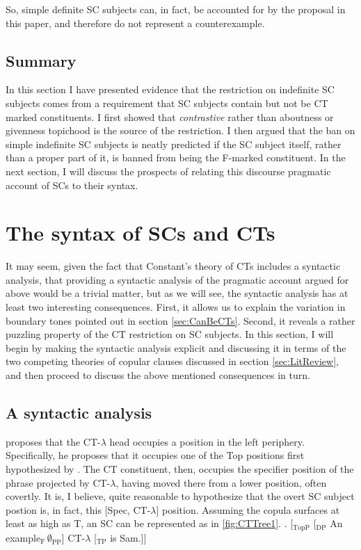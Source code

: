 \documentclass[
	letterpaper,
]{article}
\begin{document}
So, simple definite SC subjects can, in fact, be accounted for by the proposal in this paper, and therefore do not represent a counterexample.
\subsection{Summary}
In this section I have presented evidence that the restriction on indefinite SC subjects comes from a requirement that SC subjects contain but not be CT marked constituents.
I first showed that \textit{contrastive} rather than aboutness or givenness topichood is the source of the restriction.
I then argued that the ban on simple indefinite SC subjects is neatly predicted if the SC subject itself, rather than a proper part of it, is banned from being the F-marked constituent.
In the next section, I will discuss the prospects of relating this discourse pragmatic account of SCs to their syntax.
\section{The syntax of SCs and CTs}\label{sec:syntax}
It may seem, given the fact that Constant's theory of CTs includes a syntactic analysis, that providing a syntactic analysis of the pragmatic account argued for above would be a trivial matter, but as we will see, the syntactic analysis has at least two interesting consequences.
First, it allows us to explain the variation in boundary tones pointed out in section \ref{sec:CanBeCTs}.
Second, it reveals a rather puzzling property of the CT restriction on SC subjects.
In this section, I will begin by making the syntactic analysis explicit and discussing it in terms of the two competing theories of copular clauses discussed in section \ref{sec:LitReview}, and then proceed to discuss the above mentioned consequences in turn.

\subsection{A syntactic analysis}
\textcite[124]{constant2014diss} proposes that the CT-$\lambda$ head occupies a position in the left periphery.
Specifically, he proposes that it occupies one of the Top positions first hypothesized by \textcite{rizzi1997fine}.
The CT constituent, then, occupies the specifier position of the phrase projected by CT-$\lambda$, having moved there from a lower position, often covertly.
It is, I believe, quite reasonable to hypothesize that the overt SC subject postion is, in fact, this [Spec, CT-$\lambda$] position.
Assuming the copula surfaces at least as high as T, an SC can be represented as in \ref{fig:CTTree1}.
\ex.\label{fig:CTTree1} [$_\text{TopP}$ [$_\text{DP}$ An example$_\text{F}\,\emptyset_\text{PP}$] CT-$\lambda$ [$_\text{TP}$ is Sam.]]
\end{document}
